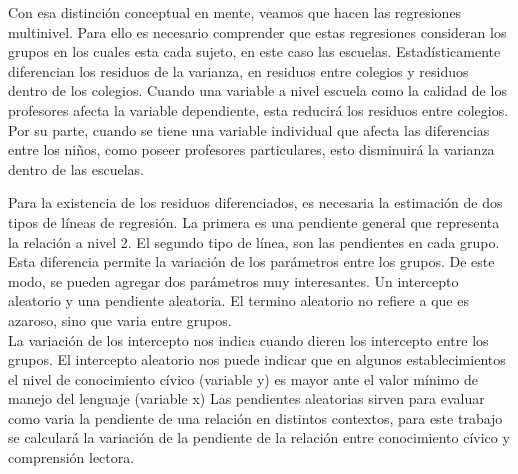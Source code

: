 \documentclass[12pt,twoside]{templates/facsothesis}
\begin{document}
Con esa distinción conceptual en mente, veamos que hacen las regresiones multinivel. Para ello es necesario comprender que estas regresiones consideran los grupos en los cuales esta cada sujeto, en este caso las escuelas. Estadísticamente diferencian los residuos de la varianza, en residuos entre colegios y residuos dentro de los colegios. Cuando una variable a nivel escuela como la calidad de los profesores afecta la variable dependiente, esta reducirá los residuos entre colegios. Por su parte, cuando se tiene una variable individual que afecta las diferencias entre los niños, como poseer profesores particulares, esto disminuirá la varianza dentro de las escuelas.

Para la existencia de los residuos diferenciados, es necesaria la estimación de dos tipos de líneas de regresión. La primera es una pendiente general que representa la relación a nivel 2. El segundo tipo de línea, son las pendientes en cada grupo. Esta diferencia permite la variación de los parámetros entre los grupos. De este modo, se pueden agregar dos parámetros muy interesantes. Un intercepto aleatorio y una pendiente aleatoria. El termino aleatorio no refiere a que es azaroso, sino que varia entre grupos.\\
La variación de los intercepto nos indica cuando dieren los intercepto entre los grupos. El intercepto aleatorio nos puede indicar que en algunos establecimientos el nivel de conocimiento cívico (variable y) es mayor ante el valor mínimo de manejo del lenguaje (variable x)
Las pendientes aleatorias sirven para evaluar como varia la pendiente de una relación en distintos contextos, para este trabajo se calculará la variación de la pendiente de la relación entre conocimiento cívico y comprensión lectora.
\end{document}
